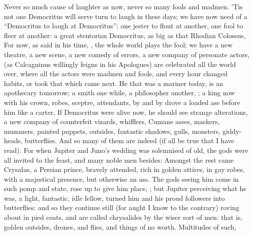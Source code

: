 Never so much cause of laughter as now, never so many fools and madmen. 'Tis
not one Democritus will serve turn to laugh in these days;
we have now need of a \enquote{Democritus to laugh at Democritus}; one jester to flout
at another, one fool to fleer at another: a great stentorian Democritus, as big
as that Rhodian Colossus, For now, as
 said in his time, , the whole world plays the fool; we have a new theatre, a new
scene, a new comedy of errors, a new company of personate actors,  (as Calcagninus willingly feigns in his Apologues) are celebrated all
the world over, where all the actors were madmen and fools,
and every hour changed habits, or took that which came next. He that was a
mariner today, is an apothecary tomorrow; a smith one while, a philosopher
another, ; a king now with his crown, robes, sceptre,
attendants, by and by drove a loaded ass before him like a carter, \etc{} If
Democritus were alive now, he should see strange alterations, a new company of
counterfeit vizards, whifflers, Cumane asses, maskers, mummers, painted
puppets, outsides, fantastic shadows, gulls, monsters, giddy-heads,
butterflies. And so many of them are indeed (if all be true
that I have read). For when Jupiter and Juno's wedding was solemnised of old,
the gods were all invited to the feast, and many noble men besides: Amongst the
rest came Crysalus, a Persian prince, bravely attended, rich in golden attires,
in gay robes, with a majestical presence, but otherwise an ass. The gods seeing
him come in such pomp and state, rose up to give him place, ; but Jupiter perceiving what he was, a
light, fantastic, idle fellow, turned him and his proud followers into
butterflies: and so they continue still (for aught I know to the contrary)
roving about in pied coats, and are called chrysalides by the wiser sort of
men: that is, golden outsides, drones, and flies, and things of no worth.
Multitudes of such, \etc{}


